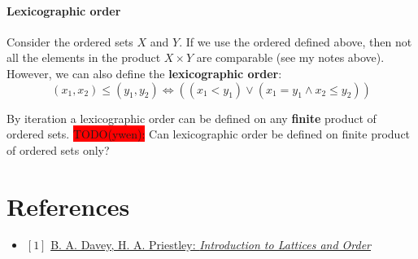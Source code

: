 \documentclass[12pt, letterpaper, oneside]{book}
\begin{document}
\subsubsection{Lexicographic order}

Consider the ordered sets $X$ and $Y$. If we use the ordered defined above, then not all the elements in the product
$X \times Y$ are comparable (see my notes above). However, we can also define the \textbf{lexicographic order}:
\[
  (x_1, x_2) \leqslant (y_1, y_2) \Leftrightarrow ((x_1 < y_1) \lor (x_1 = y_1 \land x_2 \leqslant y_2))
\]

By iteration a lexicographic order can be defined on any \textbf{finite} product of ordered sets.
\colorbox{red}{TODO(ywen):} Can lexicographic order be defined on finite product of ordered sets only?

%
%

\chapter*{References}

\begin{itemize}
  \item $[1]$ \href{https://www.cambridge.org/core/books/introduction-to-lattices-and-order/946458CB6638AF86D85BA00F5787F4F4}{B. A. Davey, H. A. Priestley: \it{Introduction to Lattices and Order}}
\end{itemize}
\end{document}
